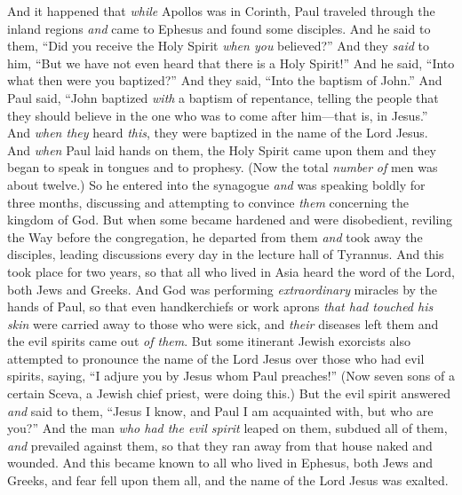 \begin{biblechapter} %
 And it happened that \textit{while} Apollos was in Corinth, Paul traveled through the inland regions \textit{and} came to Ephesus and found some disciples.
\verse And he said to them, “Did you receive the Holy Spirit \textit{when you} believed?” And they \textit{said} to him, “But we have not even heard that there is a Holy Spirit!”
\verse And he said, “Into what then were you baptized?” And they said, “Into the baptism of John.”
\verse And Paul said, “John baptized \textit{with} a baptism of repentance, telling the people that they should believe in the one who was to come after him—that is, in Jesus.”
\verse And \textit{when they} heard \textit{this}, they were baptized in the name of the Lord Jesus.
\verse And \textit{when} Paul laid hands on them, the Holy Spirit came upon them and they began to speak in tongues and to prophesy.
\verse (Now the total \textit{number} \textit{of} men was about twelve.)
\verse So he entered into the synagogue \textit{and} was speaking boldly for three months, discussing and attempting to convince \textit{them} concerning the kingdom of God.
\verse But when some became hardened and were disobedient, reviling the Way before the congregation, he departed from them \textit{and} took away the disciples, leading discussions every day in the lecture hall of Tyrannus.
\verse And this took place for two years, so that all who lived in Asia heard the word of the Lord, both Jews and Greeks.
 And God was performing \textit{extraordinary} miracles by the hands of Paul,
\verse so that even handkerchiefs or work aprons \textit{that had touched his skin} were carried away to those who were sick, and \textit{their} diseases left them and the evil spirits came out \textit{of them}.
\verse But some itinerant Jewish exorcists also attempted to pronounce the name of the Lord Jesus over those who had evil spirits, saying, “I adjure you by Jesus whom Paul preaches!”
\verse (Now seven sons of a certain Sceva, a Jewish chief priest, were doing this.)
\verse But the evil spirit answered \textit{and} said to them, “Jesus I know, and Paul I am acquainted with, but who are you?”
\verse And the man \textit{who had the evil spirit} leaped on them, subdued all of them, \textit{and} prevailed against them, so that they ran away from that house naked and wounded.
\verse And this became known to all who lived in Ephesus, both Jews and Greeks, and fear fell upon them all, and the name of the Lord Jesus was exalted.

\end{biblechapter}
